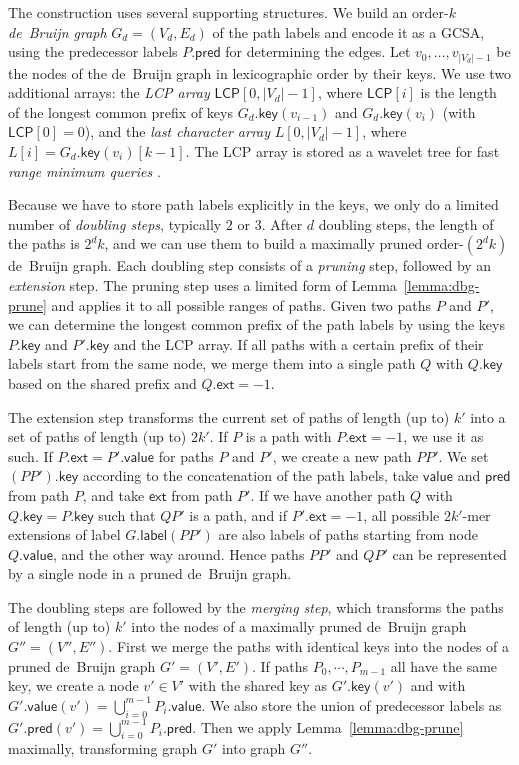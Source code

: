 \documentclass[a4paper,UKenglish]{lipics-v2016}
\newcommand{\abs}[1]{\ensuremath{\lvert #1 \rvert}}
\newcommand{\glabel}{\ensuremath{\mathsf{label}}}
\newcommand{\gpred}{\ensuremath{\mathsf{pred}}}
\newcommand{\gkey}{\ensuremath{\mathsf{key}}}
\newcommand{\gvalue}{\ensuremath{\mathsf{value}}}
\newcommand{\gext}{\ensuremath{\mathsf{ext}}}
\newcommand{\kmer}[1]{$#1$\nobreakdash-mer}
\newcommand{\orderk}[1]{order\nobreakdash-$#1$}
\newcommand{\LCP}{\ensuremath{\mathsf{LCP}}}
\begin{document}
The construction uses several supporting structures. We build an \orderk{k} \emph{de~Bruijn graph} $G_{d} = (V_{d}, E_{d})$ of the path labels and encode it as a GCSA, using the predecessor labels $P.\gpred$ for determining the edges. Let $v_{0}, \dotsc, v_{\abs{V_{d}}-1}$ be the nodes of the de~Bruijn graph in lexicographic order by their keys. We use two additional arrays: the \emph{LCP array} $\LCP[0, \abs{V_{d}}-1]$, where $\LCP[i]$ is the length of the longest common prefix of keys $G_{d}.\gkey(v_{i-1})$ and $G_{d}.\gkey(v_{i})$ (with $\LCP[0] = 0$), and the \emph{last character array} $L[0, \abs{V_{d}}-1]$, where $L[i] = G_{d}.\gkey(v_{i})[k-1]$. The LCP array is stored as a wavelet tree for fast \emph{range minimum queries} \cite{Gagie2012a}.

Because we have to store path labels explicitly in the keys, we only do a limited number of \emph{doubling steps}, typically $2$ or $3$. After $d$ doubling steps, the length of the paths is $2^{d} k$, and we can use them to build a maximally pruned \orderk{(2^{d} k)} de~Bruijn graph. Each doubling step consists of a \emph{pruning} step, followed by an \emph{extension} step. The pruning step uses a limited form of Lemma~\ref{lemma:dbg-prune} and applies it to all possible ranges of paths. Given two paths $P$ and $P'$, we can determine the longest common prefix of the path labels by using the keys $P.\gkey$ and $P'.\gkey$ and the LCP array. If all paths with a certain prefix of their labels start from the same node, we merge them into a single path $Q$ with $Q.\gkey$ based on the shared prefix and $Q.\gext = -1$.

The extension step transforms the current set of paths of length (up to) $k'$ into a set of paths of length (up to) $2k'$. If $P$ is a path with $P.\gext = -1$, we use it as such. If $P.\gext = P'.\gvalue$ for paths $P$ and $P'$, we create a new path $PP'$. We set $(PP').\gkey$ according to the concatenation of the path labels, take $\gvalue$ and $\gpred$ from path $P$, and take $\gext$ from path $P'$. If we have another path $Q$ with $Q.\gkey = P.\gkey$ such that $QP'$ is a path, and if $P'.\gext = -1$, all possible \kmer{2k'} extensions of label $G.\glabel(PP')$ are also labels of paths starting from node $Q.\gvalue$, and the other way around. Hence paths $PP'$ and $QP'$ can be represented by a single node in a pruned de~Bruijn graph.

The doubling steps are followed by the \emph{merging step}, which transforms the paths of length (up to) $k'$ into the nodes of a maximally pruned de~Bruijn graph $G'' = (V'', E'')$. First we merge the paths with identical keys into the nodes of a pruned de~Bruijn graph $G' = (V', E')$. If paths $P_{0}, \dotsm, P_{m-1}$ all have the same key, we create a node $v' \in V'$ with the shared key as $G'.\gkey(v')$ and with $G'.\gvalue(v') = \bigcup_{i=0}^{m-1} P_{i}.\gvalue$. We also store the union of predecessor labels as $G'.\gpred(v') = \bigcup_{i=0}^{m-1} P_{i}.\gpred$. Then we apply Lemma~\ref{lemma:dbg-prune} maximally, transforming graph $G'$ into graph $G''$.
\end{document}
